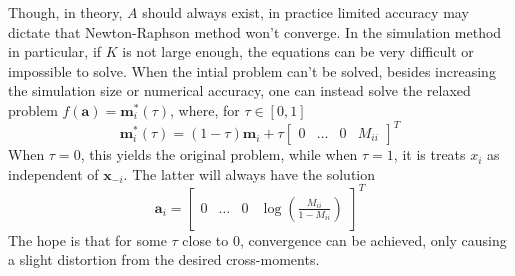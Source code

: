 \documentclass[11pt]{article}
\theoremstyle{definition}
\begin{document}
            Though, in theory, $A$ should always exist, in practice limited accuracy may dictate that Newton-Raphson method won't converge. In the simulation method in particular, if $K$ is not large enough, the equations can be very difficult or impossible to solve. When the intial problem can't be solved, besides increasing the simulation size or numerical accuracy, one can instead solve the relaxed problem  $f(\mathbf a)=\mathbf m_i^*(\tau)$, where, for $\tau\in[0,1]$
    \[\mathbf m_i^*(\tau) = (1-\tau)\mathbf m_i + \tau \left[ \begin{array}{cccc} 0 & \ldots & 0 & M_{ii} \end{array} \right]^T \]
            When $\tau=0$, this yields the original problem, while when $\tau=1$, it is treats $x_i$ as independent of $\mathbf x_{-i}$. The latter will always have the solution
            \[\mathbf a_i = \left[ \begin{array}{cccc} 0 & \ldots & 0 & \log\left(\frac{M_{ii}}{1-M_{ii}}\right) \end{array} \right]^T \]
            The hope is that for some $\tau$ close to $0$, convergence can be achieved, only causing a slight distortion from the desired cross-moments.
\end{document}
